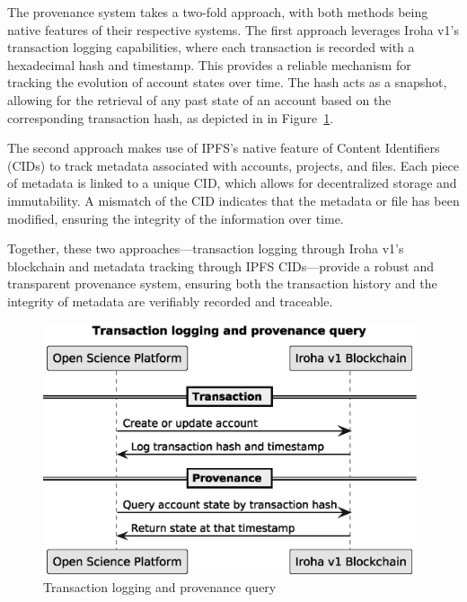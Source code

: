 \documentclass{article}
\begin{document}
The provenance system takes a two-fold approach, with both methods being native features of their respective systems. The first approach leverages Iroha v1’s transaction logging capabilities, where each transaction is recorded with a hexadecimal hash and timestamp. This provides a reliable mechanism for tracking the evolution of account states over time. The hash acts as a snapshot, allowing for the retrieval of any past state of an account based on the corresponding transaction hash, as depicted in in Figure~\ref{fig:provenance}.

The second approach makes use of IPFS’s native feature of Content Identifiers (CIDs) to track metadata associated with accounts, projects, and files. Each piece of metadata is linked to a unique CID, which allows for decentralized storage and immutability. A mismatch of the CID indicates that the metadata or file has been modified, ensuring the integrity of the information over time.

Together, these two approaches—transaction logging through Iroha v1’s blockchain and metadata tracking through IPFS CIDs—provide a robust and transparent provenance system, ensuring both the transaction history and the integrity of metadata are verifiably recorded and traceable.


\begin{figure}[htbp]
      \centering
      \includegraphics[width=0.98\textwidth, keepaspectratio]{provenance_timeline.eps}
      \caption{Transaction logging and provenance query}
      \label{fig:provenance}
\end{figure}
\end{document}

